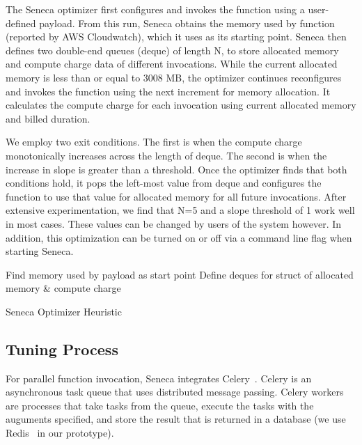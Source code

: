 The Seneca optimizer first configures and invokes the function using 
a user-defined payload.  From this run, Seneca obtains the memory 
used by function (reported by AWS Cloudwatch), 
which it uses as its starting point.
Seneca then defines two double-end queues 
(deque) of length N, to store 
allocated memory and compute charge data of different
invocations. While the current 
allocated memory is less than or equal to 3008 MB, 
the optimizer continues reconfigures and invokes the function 
using the next increment for memory allocation.  It 
calculates the compute charge for each invocation 
using current allocated memory and billed duration. 

We employ two exit conditions.  The first is when the 
compute charge monotonically increases across the length of deque. 
The second is when the increase in slope is greater than a threshold. 
Once the optimizer finds that both conditions hold, 
it pops the left-most value from deque and configures 
the function to use that value for allocated memory for all future invocations.
After extensive experimentation, we find that 
N=5 and a slope threshold of 1 work well in most cases.
These values can be changed by users of the system however.
In addition, this optimization can be turned on or off via a command line
flag when starting Seneca.

\begin{algorithm}[]
\SetAlgoLined
{}
Find memory used by payload as start point\;
Define deques for struct of allocated memory \& compute charge\;
 \caption{Seneca Optimizer Heuristic}
 \label{algo:optimizer}
\end{algorithm}

\subsection{Tuning Process}

For parallel function invocation, Seneca integrates 
Celery~\cite{ref:celery}. Celery is an asynchronous task queue 
that uses distributed message passing. Celery workers are processes 
that take tasks from the queue, execute the tasks with the auguments specified, 
and store the result that is returned 
in a database (we use Redis~\cite{ref:redis} in our prototype). 

